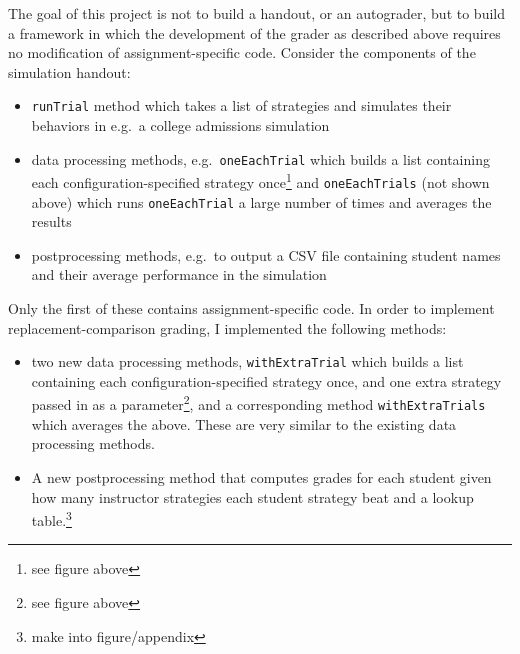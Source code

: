 \documentclass[pageno]{jpaper}
\begin{document}
The goal of this project is not to build a handout, or an autograder, but to build a framework in which the development of the grader as described above requires no modification of assignment-specific code.
Consider the components of the simulation handout:
\begin{itemize}
\item \texttt{runTrial} method which takes a list of strategies and simulates their behaviors in e.g.\ a college admissions simulation
\item data processing methods, e.g.\ \texttt{oneEachTrial} which builds a list containing each configuration-specified strategy once\footnote{see figure above} and \texttt{oneEachTrials} (not shown above) which runs \texttt{oneEachTrial} a large number of times and averages the results
\item postprocessing methods, e.g.\ to output a CSV file containing student names and their average performance in the simulation
\end{itemize}
Only the first of these contains assignment-specific code.
In order to implement replacement-comparison grading, I implemented the following methods:
\begin{itemize}
\item two new data processing methods, \texttt{withExtraTrial} which builds a list containing each configuration-specified strategy once, and one extra strategy passed in as a parameter\footnote{see figure above}, and a corresponding method \texttt{withExtraTrials} which averages the above. These are very similar to the existing data processing methods.
\item A new postprocessing method that computes grades for each student given how many instructor strategies each student strategy beat and a lookup table.\footnote{make into figure/appendix}
\end{itemize}
\end{document}
